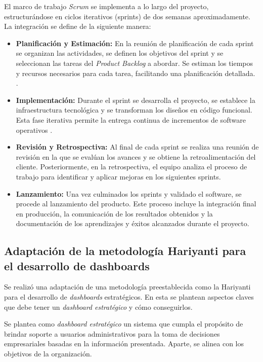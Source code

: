 \documentclass[spanish]{ieee_upb}
\begin{document}
El marco de trabajo \textit{Scrum} se implementa a lo largo del proyecto, estructurándose en ciclos iterativos (sprints) de dos semanas aproximadamente. La integración se define de la siguiente manera:

\begin{itemize}
 \item \textbf{Planificación y Estimación:} En la reunión de planificación de cada sprint se organizan las actividades, se definen los objetivos del sprint y se seleccionan las tareas del \textit{Product Backlog} a abordar. Se estiman los tiempos y recursos necesarios para cada tarea, facilitando una planificación detallada. \cite{Schwaber2004,Cohn2005}.
 \item \textbf{Implementación:} Durante el sprint se desarrolla el proyecto, se establece la infraestructura tecnológica y se transforman los diseños en código funcional. Esta fase iterativa permite la entrega continua de incrementos de software operativos \cite{Sutherland2014}.
 \item \textbf{Revisión y Retrospectiva:} Al final de cada sprint se realiza una reunión de revisión en la que se evalúan los avances y se obtiene la retroalimentación del cliente. Posteriormente, en la retrospectiva, el equipo analiza el proceso de trabajo para identificar y aplicar mejoras en los siguientes sprints.
 \item \textbf{Lanzamiento:} Una vez culminados los sprints y validado el software, se procede al lanzamiento del producto. Este proceso incluye la integración final en producción, la comunicación de los resultados obtenidos y la documentación de los aprendizajes y éxitos alcanzados durante el proyecto.
\end{itemize}


\subsection{Adaptación de la metodología Hariyanti para el desarrollo de dashboards}

Se realizó una adaptación de una metodología preestablecida como la Hariyanti\cite{hariyanti-dashboard} para el desarrollo de \textit{dashboards} estratégicos. En esta se plantean aspectos claves que debe tener un \textit{dashboard estratégico} y cómo conseguirlos.

\vspace{0.3cm}
Se plantea como \textit{dashboard estratégico} un sistema que cumpla el propósito de brindar soporte a usuarios administrativos para la toma de decisiones empresariales basadas en la información presentada. Aparte, se alinea con los objetivos de la organización.\cite{hariyanti-dashboard}
\end{document}
